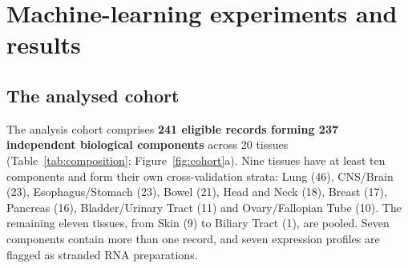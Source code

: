 \chapter{Machine-learning experiments and results}\label{ch:results}

\section{The analysed cohort}\label{sec:cohort}

The analysis cohort comprises \textbf{241 eligible records forming 237 independent
biological components} across 20 tissues (Table~\ref{tab:composition};
Figure~\ref{fig:cohort}a). Nine tissues have at least ten components and form their own
cross-validation strata: Lung (46), CNS/Brain (23), Esophagus/Stomach (23), Bowel (21), Head
and Neck (18), Breast (17), Pancreas (16), Bladder/Urinary Tract (11) and Ovary/Fallopian
Tube (10). The remaining eleven tissues, from Skin (9) to Biliary Tract (1), are pooled.
Seven components contain more than one record, and seven expression profiles are flagged
as stranded RNA preparations.

